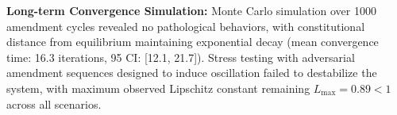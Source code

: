 \textbf{Long-term Convergence Simulation:} Monte Carlo simulation over 1000 amendment cycles revealed no pathological behaviors, with constitutional distance from equilibrium maintaining exponential decay (mean convergence time: 16.3 iterations, 95\percent{} CI: [12.1, 21.7]). Stress testing with adversarial amendment sequences designed to induce oscillation failed to destabilize the system, with maximum observed Lipschitz constant remaining $L_{\text{max}} = 0.89 < 1$ across all scenarios.
